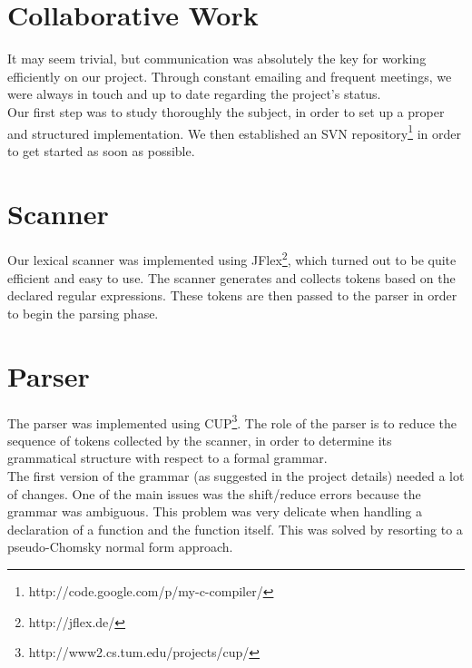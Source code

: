\documentclass{article}
\begin{document}
\section{Collaborative Work}
It may seem trivial, but communication was absolutely the key for working efficiently on our project. Through constant emailing and frequent meetings, we were always in touch and up to date regarding the project's status.\\
Our first step was to study thoroughly the subject, in order to set up a proper and structured implementation.
We then established an SVN repository\footnote{http://code.google.com/p/my-c-compiler/} in order to get started as soon as possible.

\section{Scanner}
Our lexical scanner was implemented using JFlex\footnote{http://jflex.de/}, which turned out to be quite efficient and easy to use. The scanner generates and collects tokens based on the declared regular expressions. These tokens are then passed to the parser in order to begin the parsing phase.

\section{Parser}
The parser was implemented using CUP\footnote{http://www2.cs.tum.edu/projects/cup/}. The role of the parser is to reduce the sequence of tokens collected by the scanner, in order to determine its grammatical structure with respect to a formal grammar.\\
The first version of the grammar (as suggested in the project details) needed a lot of changes. One of the main issues was the shift/reduce errors because the grammar was ambiguous. This problem was very delicate when handling a declaration of a function and the function
itself. This was solved by resorting to a pseudo-Chomsky normal form approach.
\end{document}
